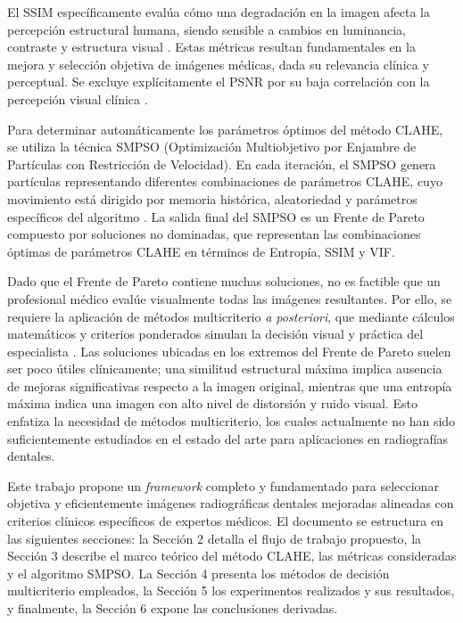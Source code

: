 \documentclass[sigplan,screen]{acmart}
\begin{document}
El SSIM específicamente evalúa cómo una degradación en la imagen afecta la percepción estructural humana, siendo sensible a cambios en luminancia, contraste y estructura visual \cite{Wang2004}. Estas métricas resultan fundamentales en la mejora y selección objetiva de imágenes médicas, dada su relevancia clínica y perceptual. Se excluye explícitamente el PSNR por su baja correlación con la percepción visual clínica \cite{Girod1993}.\par
Para determinar automáticamente los parámetros óptimos del método CLAHE, se utiliza la técnica SMPSO (Optimización Multiobjetivo por Enjambre de Partículas con Restricción de Velocidad). En cada iteración, el SMPSO genera partículas representando diferentes combinaciones de parámetros CLAHE, cuyo movimiento está dirigido por memoria histórica, aleatoriedad y parámetros específicos del algoritmo \cite{Nebro2009}. La salida final del SMPSO es un Frente de Pareto compuesto por soluciones no dominadas, que representan las combinaciones óptimas de parámetros CLAHE en términos de Entropía, SSIM y VIF.\par
Dado que el Frente de Pareto contiene muchas soluciones, no es factible que un profesional médico evalúe visualmente todas las imágenes resultantes. Por ello, se requiere la aplicación de métodos multicriterio \textit{a posteriori}, que mediante cálculos matemáticos y criterios ponderados simulan la decisión visual y práctica del especialista \cite{Parreiras2006}. Las soluciones ubicadas en los extremos del Frente de Pareto suelen ser poco útiles clínicamente; una similitud estructural máxima implica ausencia de mejoras significativas respecto a la imagen original, mientras que una entropía máxima indica una imagen con alto nivel de distorsión y ruido visual. Esto enfatiza la necesidad de métodos multicriterio, los cuales actualmente no han sido suficientemente estudiados en el estado del arte para aplicaciones en radiografías dentales.\par
Este trabajo propone un \textit{framework} completo y fundamentado para seleccionar objetiva y eficientemente imágenes radiográficas dentales mejoradas alineadas con criterios clínicos específicos de expertos médicos. El documento se estructura en las siguientes secciones: la Sección 2 detalla el flujo de trabajo propuesto, la Sección 3 describe el marco teórico del método CLAHE, las métricas consideradas y el algoritmo SMPSO. La Sección 4 presenta los métodos de decisión multicriterio empleados, la Sección 5 los experimentos realizados y sus resultados, y finalmente, la Sección 6 expone las conclusiones derivadas.\par
\end{document}
